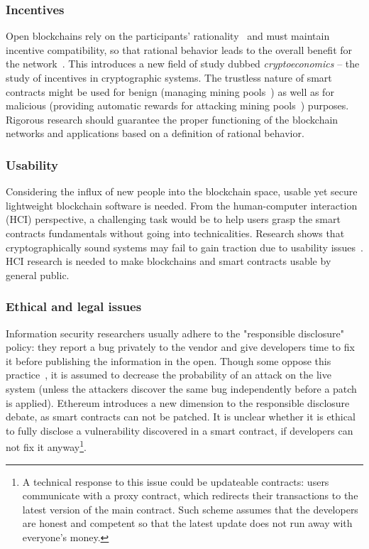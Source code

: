 \subsubsection{Incentives}	
Open blockchains rely on the participants' rationality~\cite{Chen2017a} and must maintain incentive compatibility, so that rational behavior leads to the overall benefit for the network~\cite{Luu2015}.
This introduces a new field of study dubbed \emph{cryptoeconomics} -- the study of incentives in cryptographic systems.
The trustless nature of smart contracts might be used for benign (managing mining pools~\cite{Luu2017}) as well as for malicious (providing automatic rewards for attacking mining pools~\cite{Velner2017}) purposes.
Rigorous research should guarantee the proper functioning of the blockchain networks and applications based on a definition of rational behavior.

\subsubsection{Usability}
Considering the influx of new people into the blockchain space, usable yet secure lightweight blockchain software is needed.
From the human-computer interaction (HCI) perspective, a challenging task would be to help users grasp the smart contracts fundamentals without going into technicalities.
Research shows that cryptographically sound systems may fail to gain traction due to usability issues~\cite{Ruoti2015}.
HCI research is needed to make blockchains and smart contracts usable by general public.

\subsubsection{Ethical and legal issues}
Information security researchers usually adhere to the "responsible disclosure" policy: they report a bug privately to the vendor and give developers time to fix it before publishing the information in the open.
Though some oppose this practice~\cite{Schneier2007}, it is assumed to decrease the probability of an attack on the live system (unless the attackers discover the same bug independently before a patch is applied).
Ethereum introduces a new dimension to the responsible disclosure debate, as smart contracts can not be patched.
It is unclear whether it is ethical to fully disclose a vulnerability discovered in a smart contract, if developers can not fix it anyway\footnote{A technical response to this issue could be updateable contracts: users communicate with a proxy contract, which redirects their transactions to the latest version of the main contract. Such scheme assumes that the developers are honest and competent so that the latest update does not run away with everyone's money.}.

